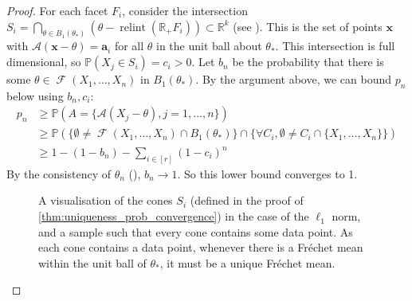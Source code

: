 \documentclass[10pt]{article}
\theoremstyle{definition}
\theoremstyle{remark}
\newcommand{\R}{\mathbb{R}}
\DeclareMathOperator{\relint}{relint}
\DeclareMathOperator{\FMset}{\mathcal{F}}
\renewcommand{\vec}[1]{\mathbf{#1}}
\newcommand{\mb}[1]{\mathbb #1}
\newcommand{\A}{\mathcal{A}}
\begin{document}
\begin{proof}
		For each facet $F_i$, consider the intersection $S_i = \bigcap_{\theta \in B_1(\theta_*)} (\theta - \relint (\R_+ F_i)) \subset \R^k$ (see ). This is the set of points $\vec x$ with $\A(\vec x - \theta) = \vec a_i$ for all $\theta$ in the unit ball about $\theta_*$. This intersection is full dimensional, so $\mb P (X_j \in S_i) = c_i > 0$. Let $b_n$ be the probability that there is some $\theta \in \FMset (X_1, \dots, X_n)$ in $B_1(\theta_*)$. By the argument above, we can bound $p_n$ below using $b_n, c_i$:
		\begin{align*}
			p_n &\geq \mb P(A = \{ \A(X_j - \theta), j=1,\dots,n \}) \\
			&\geq \mb P(\{\emptyset \neq \FMset(X_1,\dots,X_n) \cap B_1(\theta_*)\} \cap \{ \forall C_i, \emptyset \neq C_i \cap \{ X_1, \dots, X_n \} \}) \\
			&\geq 1 - (1-b_n) - \textstyle \sum_{i \in [r]} (1-c_i)^n
		\end{align*}
		By the consistency of $\theta_n$ (), $b_n \rightarrow 1$. So this lower bound converges to 1.
		\begin{figure}[ht!]
			\centering
			\caption{A visualisation of the cones $S_i$ (defined in the proof of \cref{thm:uniqueness_prob_convergence}) in the case of the $\ell_1$ norm, and a sample such that every cone contains some data point. As each cone contains a data point, whenever there is a Fr\'echet mean within the unit ball of $\theta_*$, it must be a unique Fr\'echet mean.}
			\label{fig:unique_prob_to_1}
		\end{figure}
	\end{proof}
	
\end{document}
